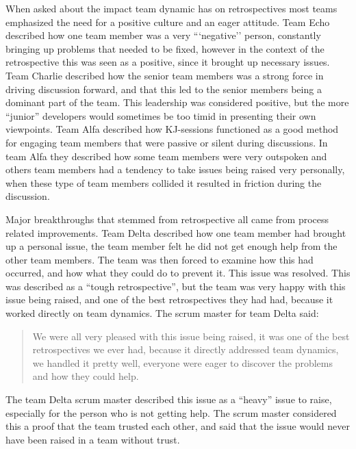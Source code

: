 \label{question-20}
When asked about the impact team dynamic has on retrospectives most teams emphasized the need for a positive culture and an eager attitude. Team Echo described how one team member was a very ```negative'' person, constantly bringing up problems that needed to be fixed, however in the context of the retrospective this was seen as a positive, since it brought up necessary issues. Team Charlie described how the senior team members was a strong force in driving discussion forward, and that this led to the senior members being a dominant part of the team. This leadership was considered positive, but the more ``junior'' developers would sometimes be too timid in presenting their own viewpoints. Team Alfa described how KJ-sessions functioned as a good method for engaging team members that were passive or silent during discussions. In team Alfa they described how some team members were very outspoken and others team members had a tendency to take issues being raised very personally, when these type of team members collided it resulted in friction during the discussion. 

\label{question-21}
Major breakthroughs that stemmed from retrospective all came from process related improvements. Team Delta described how one team member had brought up a personal issue, the team member felt he did not get enough help from the other team members. The team was then forced to examine how this had occurred, and how what they could do to prevent it. This issue was resolved. This was described as a ``tough retrospective'', but the team was very happy with this issue being raised, and one of the best retrospectives they had had, because it worked directly on team dynamics. The scrum master for team Delta said:

\begin{quote}
We were all very pleased with this issue being raised, it was one of the best retrospectives we ever had, because it directly addressed team dynamics, we handled it pretty well, everyone were eager to discover the problems and how they could help.
\end{quote}

The team Delta scrum master described this issue as a ``heavy'' issue to raise, especially for the person who is not getting help. The scrum master considered this a proof that the team trusted each other, and said that the issue would never have been raised in a team without trust.